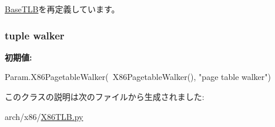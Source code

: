 \hyperlink{classBaseTLB_1_1BaseTLB_acce15679d830831b0bbe8ebc2a60b2ca}{BaseTLB}を再定義しています。\hypertarget{classX86TLB_1_1X86TLB_a38c6e2cd4db9b456da7637543e59ccbe}{
\subsubsection[{walker}]{\setlength{\rightskip}{0pt plus 5cm}tuple {\bf walker}}}
\label{classX86TLB_1_1X86TLB_a38c6e2cd4db9b456da7637543e59ccbe}
{\bfseries 初期値:}
\begin{DoxyCode}
Param.X86PagetableWalker(\
            X86PagetableWalker(), "page table walker")
\end{DoxyCode}


このクラスの説明は次のファイルから生成されました:\begin{DoxyCompactItemize}
\item 
arch/x86/\hyperlink{X86TLB_8py}{X86TLB.py}\end{DoxyCompactItemize}
